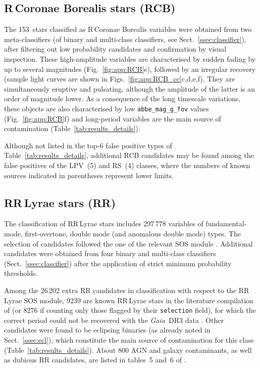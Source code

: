 \documentclass[longauth]{aa}
\def\gdr3{\textit{Gaia}~DR3\xspace}
\begin{document}
\subsection{R\,Coronae Borealis stars (RCB)\label{ssec:rcb}}

The 153~stars classified as R\,Coronae Borealis variables were obtained from two meta-classifiers (of binary and multi-class classifiers, see Sect.~\ref{ssec:classifier}), after filtering out low probability candidates and  confirmation by visual inspection.
These high-amplitude variables are characterised by sudden fading by up to several magnitudes (Fig.~\ref{fig:app:RCB}e), followed by an irregular recovery (sample light curves are shown in Figs.~\ref{fig:app:RCB_cc}c,d,e,f). They are simultaneously eruptive and pulsating, although the amplitude of the latter is an order of magnitude lower. As a consequence of the long timescale variations, these objects are also characterised by low \texttt{abbe\_mag\_g\_fov} values (Fig.~\ref{fig:app:RCB}f) and long-period variables are the main source of contamination (Table~\ref{tab:results_details}).

Although not listed in the top-6 false positive types of Table~\ref{tab:results_details}, additional RCB candidates may be found among the false positives of the LPV~(5) and RS~(4) classes, where the numbers of known sources indicated in parentheses represent lower limits.



\subsection{RR\,Lyrae stars (RR)\label{ssec:rr}}

The classification of RR\,Lyrae stars includes 297\,778 variables of fundamental-mode, first-overtone, double mode (and anomalous double mode) types. The selection of  candidates followed the one of the relevant SOS module \citep{DR3-DPACP-168}. 
Additional candidates were obtained from four binary and multi-class classifiers (Sect.~\ref{ssec:classifier}) after the application of strict minimum probability thresholds.

Among the 26\,202 extra RR candidates in classification with respect to the RR\,Lyrae SOS module, 9239 are known RR\,Lyrae stars in the literature compilation of \citet{DR3-DPACP-177} (or 8276 if counting only those flagged by their \texttt{selection} field), 
for which the correct period could not be recovered with the \gdr3 data \citep{DR3-DPACP-168}. 
Other candidates were found to be eclipsing binaries (as already noted in Sect.~\ref{ssec:ecl}), which constitute the main source of contamination for this class (Table~\ref{tab:results_details}). 
About 800 AGN and galaxy contaminants, as well as dubious RR candidates, are listed in tables~5 and~6 of \citet{DR3-DPACP-168}.
\end{document}
